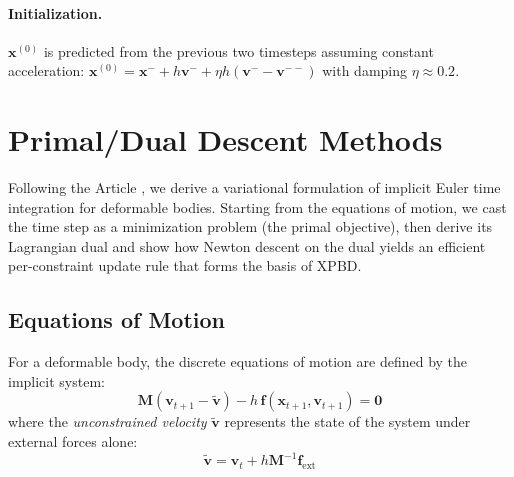 \documentclass{article}
\begin{document}
\paragraph{Initialization.}
$\mathbf{x}^{(0)}$ is predicted from the previous two timesteps assuming constant acceleration: $\mathbf{x}^{(0)} = \mathbf{x}^- + h\mathbf{v}^- + \eta h(\mathbf{v}^- - \mathbf{v}^{--})$ with damping $\eta \approx 0.2$.


\newpage

\section{Primal/Dual Descent Methods \cite{macklin2020primal}}
\label{sec:primal_dual}

Following the Article \cite{macklin2020primal}, we derive a variational formulation of implicit Euler time integration for deformable bodies. Starting from the equations of motion, we cast the time step as a minimization problem (the primal objective), then derive its Lagrangian dual and show how Newton descent on the dual yields an efficient per-constraint update rule that forms the basis of XPBD.

\subsection{Equations of Motion}

For a deformable body, the discrete equations of motion are defined by the implicit system:
\begin{equation}
    \mathbf{M}(\mathbf{v}_{t+1} - \tilde{\mathbf{v}}) - h\,\mathbf{f}(\mathbf{x}_{t+1}, \mathbf{v}_{t+1}) = \mathbf{0}
\end{equation}
where the \textit{unconstrained velocity} $\tilde{\mathbf{v}}$ represents the state of the system under external forces alone:
\begin{equation}
    \tilde{\mathbf{v}} = \mathbf{v}_t + h \mathbf{M}^{-1} \mathbf{f}_{\text{ext}}
\end{equation}
\end{document}
